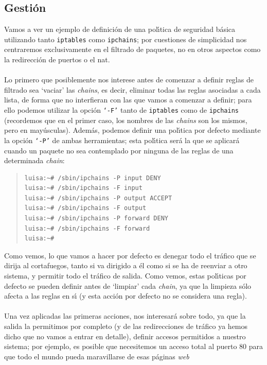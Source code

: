 \subsection{Gesti\'on}
Vamos a ver un ejemplo de definici\'on de una pol\'{\i}tica de seguridad 
b\'asica utilizando tanto {\tt iptables} como {\tt ipchains}; por cuestiones
de simplicidad nos centraremos exclusivamente en el filtrado de paquetes, no en
otros aspectos como la redirecci\'on de puertos o el {\sc nat}.\\
\\Lo primero que posiblemente nos interese antes de comenzar a definir reglas
de filtrado sea `vaciar' las {\it chains}, es decir, eliminar todas las reglas
asociadas a cada lista, de forma que no interfieran con las que vamos a
comenzar a definir; para ello podemos utilizar la opci\'on {\tt `-F'} tanto
de {\tt iptables} como de {\tt ipchains} (recordemos que en el primer caso, los
nombres de las {\it chains} son los mismos, pero en may\'usculas). Adem\'as, 
podemos definir una pol\'{\i}tica por defecto mediante la opci\'on {\tt `-P'} de
ambas herramientas; esta pol\'{\i}tica ser\'a la que se aplicar\'a cuando un
paquete no sea contemplado por ninguna de las reglas de una determinada {\it
chain}:
\begin{quote}
\begin{verbatim}
luisa:~# /sbin/ipchains -P input DENY
luisa:~# /sbin/ipchains -F input
luisa:~# /sbin/ipchains -P output ACCEPT
luisa:~# /sbin/ipchains -F output
luisa:~# /sbin/ipchains -P forward DENY
luisa:~# /sbin/ipchains -F forward
luisa:~# 
\end{verbatim}
\end{quote}
Como vemos, lo que vamos a hacer por defecto es denegar todo el tr\'afico que
se dirija al cortafuegos, tanto si va dirigido a \'el como si se ha de reenviar
a otro sistema, y permitir todo el tr\'afico de salida. Como vemos, estas
pol\'{\i}ticas por defecto se pueden definir antes de `limpiar' cada {\it 
chain}, ya que la limpieza s\'olo afecta a las reglas en s\'{\i} (y esta 
acci\'on por defecto no se considera una regla).\\
\\Una vez aplicadas las primeras acciones, nos interesar\'a sobre todo, ya que
la salida la permitimos por completo (y de las redirecciones de tr\'afico ya
hemos dicho que no vamos a entrar en detalle), definir accesos permitidos a 
nuestro sistema; por ejemplo, es posible que necesitemos un acceso total al
puerto 80 para que todo el mundo pueda maravillarse de esas p\'aginas {\it web}
